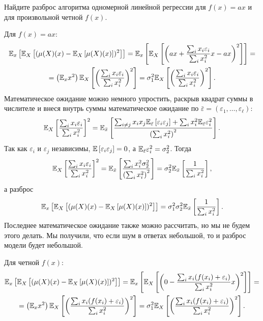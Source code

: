 \documentclass[12pt,fleqn]{article}
\begin{document}
\begin{vkProblem}
    Найдите разброс алгоритма одномерной линейной регрессии для $f(x) = ax$ и для произвольной четной $f(x)$. 
\end{vkProblem}
\begin{esSolution}
    Для $f(x) = ax:$
    \begin{multline*}
    \mathbb{E}_{x}\left[\mathbb{E}_{X}\left[(\mu(X)(x) - \mathbb{E}_{X}\left[\mu(X)(x)\right] )^2\right]\right] = 
    \mathbb{E}_{x}\left[\mathbb{E}_{X}\left[\left(a x +  \dfrac{\sum_i x_i \varepsilon_i}{\sum_i x_i^2} x - ax\right)^2\right]\right]
    = \\ =
    \left( \mathbb{E}_{x} x^2 \right)
    \mathbb{E}_{X}\left[\left(\dfrac{\sum_i x_i \varepsilon_i}{\sum_i x_i^2}\right)^2\right]
    =
    \sigma_1^2\mathbb{E}_{X}\left[\left(\dfrac{\sum_i x_i \varepsilon_i}{\sum_i x_i^2} \right)^2\right].
    \end{multline*}
    Математическое ожидание можно немного упростить, раскрыв квадрат суммы в числителе и внеся внутрь суммы математическое ожидание по $\bar \varepsilon = (\varepsilon_1, \dots, \varepsilon_\ell)$:
    $$
    \mathbb{E}_{X}\left[\dfrac{\sum_i x_i \varepsilon_i}{\sum_i x_i^2}\right]^2
    =
    \mathbb{E}_{\bar x} \left[ \dfrac {\sum_{i \ne j} x_i x_j \mathbb{E}_{\bar \varepsilon } \left[\varepsilon_i \varepsilon_j\right]
    +
    \sum_i x_i^2 \mathbb{E}_{\bar \varepsilon } \varepsilon_i^2 } {\left(\sum_i x_i^2\right)^2}\right].
    $$
    Так как $\varepsilon_i$ и $\varepsilon_j$ независимы, $\mathbb{E}\left[\varepsilon_i \varepsilon_j\right] = 0$, а $\mathbb{E}_{\bar \varepsilon } \varepsilon_i^2 = \sigma_2^2$. Тогда
    $$
    \mathbb{E}_{X}\left[\dfrac{\sum_i x_i \varepsilon_i}{\sum_i x_i^2}\right]^2
    =
    \mathbb{E}_{\bar x} \left[ \dfrac {\sum_i x_i^2 \sigma_2^2} {\left(\sum_i x_i^2\right)^2}\right]
    =
    \sigma_2^2 \mathbb{E}_{\bar x} \left[ \dfrac 1 {\sum_i x_i^2} \right],
    $$
    а разброс
    $$
    \mathbb{E}_{x}\left[\mathbb{E}_{X}\left[(\mu(X)(x) - \mathbb{E}_{X}\left[\mu(X)(x)\right] )^2\right]\right]
    =
    \sigma_1^2 \sigma_2^2\mathbb{E}_{\bar x} \left[ \dfrac 1 {\sum_i x_i^2} \right].
    $$
    Последнее математическое ожидание также можно рассчитать, но мы не будем этого делать. Мы получили, что если шум в ответах небольшой, то и разброс модели будет небольшой.
    
    \noindent Для четной $f(x)$:
    \begin{multline*}
    \mathbb{E}_{x}\left[\mathbb{E}_{X}\left[(\mu(X)(x) - \mathbb{E}_{X}\left[\mu(X)(x)\right] )^2\right]\right]
    =
    \mathbb{E}_{x}\left[\mathbb{E}_{X}\left[\left( 0 - \dfrac{\sum_i x_i (f(x_i)+\varepsilon_i)}{\sum_i x_i^2} x\right)^2\right]\right]
    = \\=
    \left( \mathbb{E}_{x} x^2 \right)
    \mathbb{E}_{X}\left[\left(\dfrac{\sum_i x_i (f(x_i)+\varepsilon_i)}{\sum_i x_i^2}\right)^2\right]
    =
    \sigma_1^2\mathbb{E}_{X}\left[\left(\dfrac{\sum_i x_i (f(x_i)+\varepsilon_i)}{\sum_i x_i^2}\right)^2\right].
    \end{multline*}
\end{esSolution}
\end{document}
